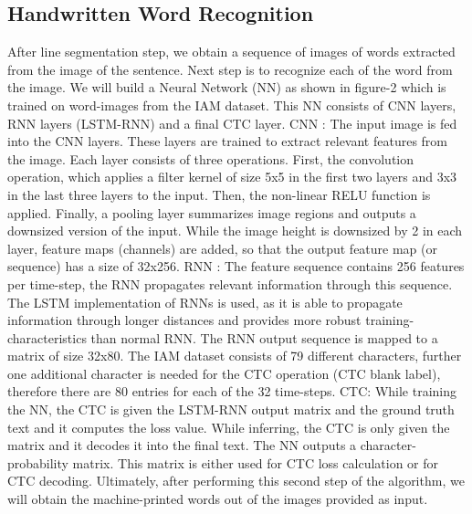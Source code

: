 \documentclass[a4paper, 10pt,twocolumn]{article}
\begin{document}
\subsection*{Handwritten Word Recognition}
After line segmentation step, we obtain a sequence of images of words extracted from the image of the sentence. Next step is to recognize each of the word from the image. We will build a Neural Network (NN) as shown in figure-2 which is trained on word-images from the IAM dataset. This NN consists of CNN layers, RNN layers (LSTM-RNN) and a final CTC layer. \newline \newline
CNN : The input image is fed into the CNN layers. These layers are trained to extract relevant features from the image. Each layer consists of three operations. First, the convolution operation, which applies a filter kernel of size 5x5 in the first two layers and 3x3 in the last three layers to the input. Then, the non-linear RELU function is applied. Finally, a pooling layer summarizes image regions and outputs a downsized version of the input. While the image height is downsized by 2 in each layer, feature maps (channels) are added, so that the output feature map (or sequence) has a size of 32x256.
\newline \newline
RNN : The feature sequence contains 256 features per time-step, the RNN propagates relevant information through this sequence. The LSTM implementation of RNNs is used, as it is able to propagate information through longer distances and provides more robust training-characteristics than normal RNN. The RNN output sequence is mapped to a matrix of size 32x80. The IAM dataset consists of 79 different characters, further one additional character is needed for the CTC operation (CTC blank label), therefore there are 80 entries for each of the 32 time-steps.
\newline \newline
CTC: While training the NN, the CTC is given the LSTM-RNN output matrix and the ground truth text and it computes the loss value. While inferring, the CTC is only given the matrix and it decodes it into the final text.
\newline \newline
The NN outputs a character-probability matrix. This matrix is either used for CTC loss calculation or for CTC decoding. Ultimately, after performing this second step of the algorithm, we will obtain the machine-printed words out of the images provided as input.
\end{document}
